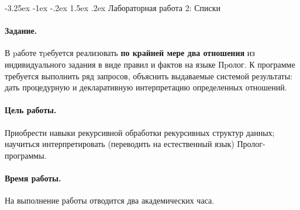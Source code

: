 \documentclass[12pt, openany, twoside]{book} %
\makeatletter
\renewcommand\section{\@startsection {section}{1}{\z@}%
                                   {-3.25ex \@plus -1ex \@minus -.2ex}%
                                   {1.5ex \@plus.2ex}%
                                   {\normalfont\large\bfseries}}
\makeatother
\begin{document}
\section{Лабораторная работа 2: Списки}

\paragraph{Задание.} В pаботе тpебуется реализовать {\bf по крайней мере два отношения} из индивидуального задания в виде правил и фактов на языке Пpолог. К программе требуется выполнить ряд запросов, объяснить выдаваемые системой результаты: дать процедурную и декларативную интерпретацию определенных отношений.

\paragraph{Цель работы.} Приобрести навыки рекурсивной обработки рекурсивных структур данных; научиться интерпретировать (переводить на естественный язык) Пролог-программы.

\paragraph{Время работы.} На выполнение работы отводится два академических часа.
\end{document}
